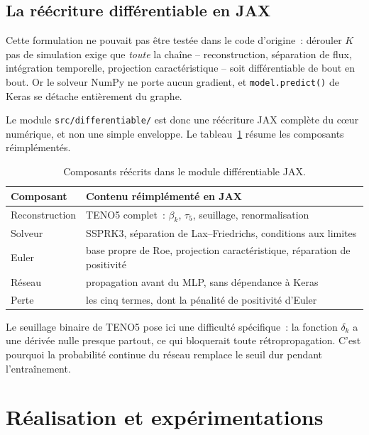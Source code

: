 \documentclass[12pt,a4paper,oneside]{report}
\begin{document}
\section{La réécriture différentiable en JAX}
\label{sec:jax}

Cette formulation ne pouvait pas être testée dans le code d'origine~: dérouler
$K$ pas de simulation exige que \emph{toute} la chaîne -- reconstruction,
séparation de flux, intégration temporelle, projection caractéristique -- soit
différentiable de bout en bout. Or le solveur NumPy ne porte aucun gradient, et
\texttt{model.predict()} de Keras se détache entièrement du graphe.

Le module \texttt{src/differentiable/} est donc une réécriture JAX complète du
cœur numérique, et non une simple enveloppe. Le tableau~\ref{tab:jax} résume
les composants réimplémentés.

\begin{table}[H]
\centering
\begin{tabularx}{\textwidth}{@{}lX@{}}
\toprule
\textbf{Composant} & \textbf{Contenu réimplémenté en JAX} \\
\midrule
Reconstruction & TENO5 complet~: $\beta_k$, $\tau_5$, seuillage, renormalisation \\
\rowrule
Solveur & SSPRK3, séparation de Lax--Friedrichs, conditions aux limites \\
\rowrule
Euler & base propre de Roe, projection caractéristique, réparation de positivité \\
\rowrule
Réseau & propagation avant du MLP, sans dépendance à Keras \\
\rowrule
Perte & les cinq termes, dont la pénalité de positivité d'Euler \\
\bottomrule
\end{tabularx}
\caption{Composants réécrits dans le module différentiable JAX.}
\label{tab:jax}
\end{table}

Le seuillage binaire de TENO5 pose ici une difficulté spécifique~: la fonction
$\delta_k$ a une dérivée nulle presque partout, ce qui bloquerait toute
rétropropagation. C'est pourquoi la probabilité continue du réseau remplace le
seuil dur pendant l'entraînement.

\chapter{Réalisation et expérimentations}
\label{chap:realisation}
\end{document}
